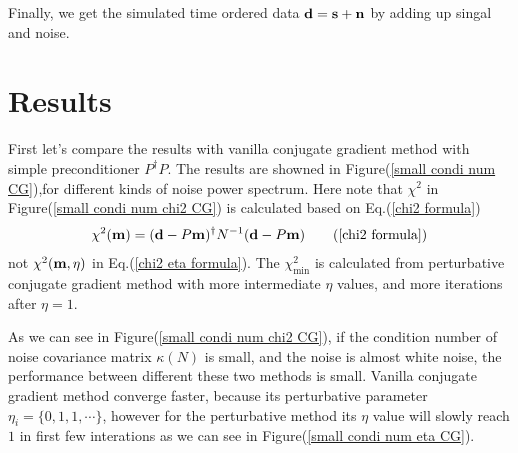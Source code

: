 \documentclass[11pt, letterpaper]{article}
\newcommand{\vbd}{\vb{d}}
\newcommand{\vbm}{\vb{m}}
\newcommand{\Pdagger}{P^{\dagger}}
\begin{document}
Finally, we get the simulated time ordered data $\vb{d} = \vb{s} + \vb{n}$ by
adding up singal and noise.

\section{Results}
First let's compare the results with vanilla conjugate gradient method with
simple preconditioner $\Pdagger P$.
The results are showned in Figure(\ref{small condi num CG}),for different kinds
of noise power spectrum.
Here note that $\chi^2$ in Figure(\ref{small condi num chi2 CG}) is calculated
based on Eq.(\ref{chi2 formula})
\begin{align}
\chi^2(\vbm) = (\vbd - P\vbm)^{\dagger} N^{-1} (\vbd - P \vbm)
\tag{\ref{chi2 formula}}
\end{align}
not $\chi^2(\vbm, \eta)$ in Eq.(\ref{chi2 eta formula}).
The $\chi^2_{\text{min}}$ is calculated from perturbative conjugate gradient
method with more intermediate $\eta$ values, and more iterations after
$\eta=1$.

As we can see in Figure(\ref{small condi num chi2 CG}), if the condition number
of noise covariance matrix $\kappa(N)$ is small, and the noise is almost white
noise, the performance between different these two methods is small.
Vanilla conjugate gradient method converge faster, because its perturbative
parameter $\eta_{i}=\{0,1,1,\cdots\}$, however for the perturbative method its
$\eta$ value will slowly reach $1$ in first few interations as we can see in
Figure(\ref{small condi num eta CG}).
\end{document}
